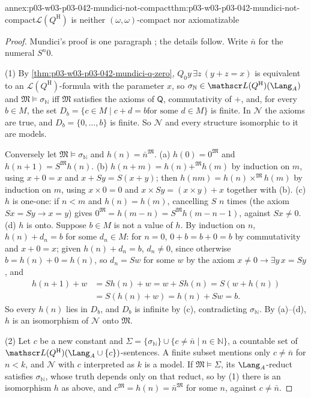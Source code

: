 \begin{annexitem}{annex:p03-w03-p03-042-mundici-not-compact}{thm:p03-w03-p03-042-mundici-not-compact}{\(\mathscr L(Q^{\mathrm H})\) is neither \((\omega,\omega)\)-compact nor axiomatizable}
\begin{proof}
Mundici's proof is one paragraph \cite[p.~216]{Mundici1985OtherQuantifiers};
the details follow.  Write \(\bar n\) for the numeral \(S^n0\).

(1) By \cref{thm:p03-w03-p03-042-mundici-q-zero}, \(Q_0y\,\exists z\,
(y+z=x)\) is equivalent to an \(\mathscr L(Q^{\mathrm H})\)-formula with
the parameter \(x\), so \(\sigma_{\mathbb N}\in\mathscr L(Q^{\mathrm
H})(\Lang_A)\) and \(\mathfrak M\models\sigma_{\mathbb N}\) iff
\(\mathfrak M\) satisfies the axioms of \(\mathsf Q\), commutativity of
\(+\), and, for every \(b\in M\), the set \(D_b=\{c\in M\mid c+d=b\text{
for some }d\in M\}\) is finite.  In \(\mathcal N\) the axioms are true,
and \(D_b=\{0,\ldots,b\}\) is finite.  So \(\mathcal N\) and every
structure isomorphic to it are models.

Conversely let \(\mathfrak M\models\sigma_{\mathbb N}\) and
\(h(n)=\bar n^{\mathfrak M}\).  (a) \(h(0)=0^{\mathfrak M}\) and
\(h(n+1)=S^{\mathfrak M}h(n)\).  (b) \(h(n+m)=h(n)+^{\mathfrak M}h(m)\) by
induction on \(m\), using \(x+0=x\) and \(x+Sy=S(x+y)\); then \(h(nm)=
h(n)\times^{\mathfrak M}h(m)\) by induction on \(m\), using \(x\times0=0\)
and \(x\times Sy=(x\times y)+x\) together with (b).  (c) \(h\) is
one-one: if \(n<m\) and \(h(n)=h(m)\), cancelling \(S\) \(n\) times (the
axiom \(Sx=Sy\to x=y\)) gives \(0^{\mathfrak M}=h(m-n)=S^{\mathfrak
M}h(m-n-1)\), against \(Sx\neq0\).  (d) \(h\) is onto.  Suppose \(b\in M\)
is not a value of \(h\).  By induction on \(n\), \(h(n)+d_n=b\) for some
\(d_n\in M\): for \(n=0\), \(0+b=b+0=b\) by commutativity and \(x+0=x\);
given \(h(n)+d_n=b\), \(d_n\neq0\), since otherwise \(b=h(n)+0=h(n)\), so
\(d_n=Sw\) for some \(w\) by the axiom \(x\neq0\to\exists y\,x=Sy\), and
\begin{align*}
 h(n+1)+w&=Sh(n)+w=w+Sh(n)=S(w+h(n))\\
 &=S(h(n)+w)=h(n)+Sw=b .
\end{align*}
So every \(h(n)\) lies in \(D_b\), and \(D_b\) is infinite by (c),
contradicting \(\sigma_{\mathbb N}\).  By (a)--(d), \(h\) is an
isomorphism of \(\mathcal N\) onto \(\mathfrak M\).

(2) Let \(c\) be a new constant and \(\Sigma=\{\sigma_{\mathbb N}\}\cup
\{c\neq\bar n\mid n\in\mathbb N\}\), a countable set of
\(\mathscr L(Q^{\mathrm H})(\Lang_A\cup\{c\})\)-sentences.  A finite
subset mentions only \(c\neq\bar n\) for \(n<k\), and \(\mathcal N\) with
\(c\) interpreted as \(k\) is a model.  If \(\mathfrak M\models\Sigma\),
its \(\Lang_A\)-reduct satisfies \(\sigma_{\mathbb N}\), whose truth
depends only on that reduct, so by (1) there is an isomorphism \(h\) as
above, and \(c^{\mathfrak M}=h(n)=\bar n^{\mathfrak M}\) for some \(n\),
against \(c\neq\bar n\).


\end{proof}
\end{annexitem}
